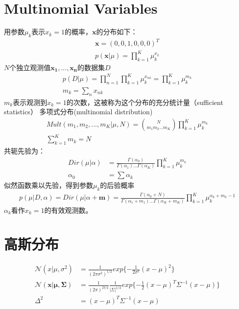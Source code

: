 \documentclass[a4paper]{article}
\begin{document}
\section{Multinomial Variables}
用参数$\mu_k$表示$x_k=1$的概率，$\mathbf{x}$的分布如下：
\begin{align*}
  \mathbf{x} = (0,0,1,0,0,0)^T\\
  p(\mathbf{x}|\mu) = \prod_{k=1}^K\mu_k^{x_k}
\end{align*}
$N$个独立观测值$\mathbf{x_1},...,\mathbf{x_n}$的数据集$D$
\begin{align*}
  p(D|\mu) = \prod_{n=1}^N  \prod_{k=1}^K \mu_k^{x_{nk}} = \prod_{k=1}^K \mu_k^{m_k}\\
  m_k = \sum_n x_{nk}
\end{align*}
$m_k$表示观测到$x_k=1$的次数，这被称为这个分布的充分统计量（sufficient statistics）
多项式分布(multinomial distribution)
\begin{align*}
  Mult(m_1,m_2,...,m_K|\mu,N) = {N \choose m_1m_2...m_K} \prod_{k=1}^K \mu_k^{m_k}\\
  \sum_{k=1}^K m_k = N
\end{align*}
共轭先验为：
\begin{align*}
  Dir(\mu|\alpha) &= \frac{\Gamma(\alpha_0)}{\Gamma(\alpha_1)...\Gamma(\alpha_K)} \prod_{k=1}^K \mu_k^{m_k}\\
\alpha_0 &= \sum \alpha_k
\end{align*}
似然函数乘以先验，得到参数${\mu_k}$的后验概率
\begin{align*}
  p(\mu|D,\alpha) = Dir(\mu|\alpha+\mathbf{m}) = \frac{\Gamma(\alpha_0+N)}{\Gamma(\alpha_1+m_1)...\Gamma(\alpha_K+m_K)} \prod_{k=1}^K \mu_k^{\alpha_k+m_k-1}
\end{align*}
$\alpha_k$看作$x_k=1$的有效观测数。

\section{高斯分布}
\begin{align*}
  \mathcal{N}(x|\mu,\sigma^2) &= \frac{1}{(2\pi\sigma^2)^{1/2}} exp \{-\frac{1}{2\sigma^2} (x-\mu)^2\}\\
  \mathcal{N}(\mathbf{x}|\boldsymbol{\mu},\boldsymbol{\Sigma}) &= \frac{1}{(2\pi)^{D/2}} \frac{1}{|\Sigma|^{1/2}} exp \{-\frac{1}{2} (x-\mu)^T \Sigma^{-1} (x-\mu) \}\\
  \Delta^2 &= (x-\mu)^T \Sigma^{-1} (x-\mu)
\end{align*}
\end{document}
